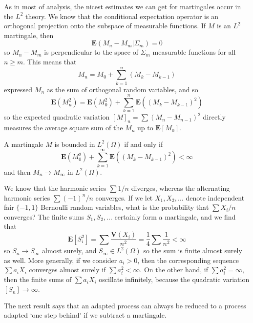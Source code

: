 As in most of analysis, the nicest estimates we can get for martingales occur in the $L^2$ theory. We know that the conditional expectation operator is an orthogonal projection onto the subspace of measurable functions. If $M$ is an $L^2$ martingale, then
%
\[ \mathbf{E}(M_n - M_m | \Sigma_m) = 0 \]
%
so $M_n - M_m$ is perpendicular to the space of $\Sigma_m$ measurable functions for all $n \geq m$. This means that
%
\[ M_n = M_0 + \sum_{k = 1}^n (M_k - M_{k-1}) \]
%
expressed $M_n$ as the sum of orthogonal random variables, and so
%
\[ \mathbf{E}(M_n^2) = \mathbf{E}(M_0^2) + \sum_{k = 1}^n \mathbf{E}((M_k - M_{k-1})^2) \]
%
so the expected quadratic variation $[M]_n = \sum (M_n - M_{n-1})^2$ directly measures the average square sum of the $M_n$ up to $\mathbf{E}[M_0]$.

\begin{theorem}
    A martingale $M$ is bounded in $L^2(\Omega)$ if and only if
    \[ \mathbf{E}(M_0^2) + \sum_{k = 1}^\infty \mathbf{E}((M_k - M_{k-1})^2) < \infty \]
    and then $M_n \to M_\infty$ in $L^2(\Omega)$.
\end{theorem}

\begin{example}
    We know that the harmonic series $\sum 1/n$ diverges, whereas the alternating harmonic series $\sum (-1)^n/n$ converges. If we let $X_1, X_2, \dots$ denote independent fair $\{ -1, 1 \}$ Bernoulli random variables, what is the probability that $\sum X_i/n$ converges? The finite sums $S_1, S_2, \dots$ certainly form a martingale, and we find that
    \[ \mathbf{E}[S_i^2] = \sum \frac{\mathbf{V}(X_i)}{n^2} = \frac{1}{4} \sum \frac{1}{n^2} < \infty \]
    so $S_n \to S_\infty$ almost surely, and $S_\infty \in L^2(\Omega)$ so the sum is finite almost surely as well. More generally, if we consider $a_i > 0$, then the corresponding sequence $\sum a_iX_i$ converges almost surely if $\sum a_i^2 < \infty$. On the other hand, if $\sum a_i^2 = \infty$, then the finite sums of $\sum a_iX_i$ oscillate infinitely, because the quadratic variation $[S_n] \to \infty$.
\end{example}

The next result says that an adapted process can always be reduced to a process adapted `one step behind' if we subtract a martingale.


